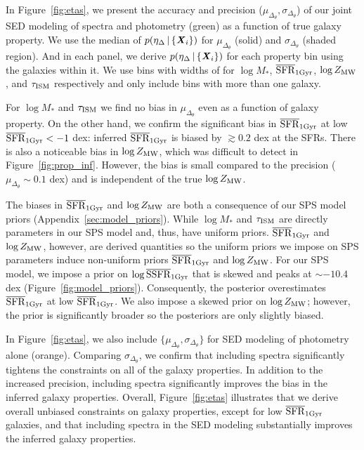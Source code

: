 In Figure~\ref{fig:etas}, we present the accuracy and precision
($\mu_{\Delta_{\theta}}, \sigma_{\Delta_{\theta}}$) of our joint
SED modeling of spectra and photometry (green) as a function of true galaxy
property. 
We use the median of $p(\eta_\Delta \,|\, \{{\textbf{\textit{X}}_i}\})$ for
$\mu_{\Delta_{\theta}}$ (solid) and $\sigma_{\Delta_{\theta}}$ (shaded region).
And in each panel, we derive $p(\eta_\Delta \,|\, \{{\textbf{\textit{X}}_i}\})$ for each
property bin using the galaxies within it.
We use bins with widths of  for $\log
M_*$, $\overline{\rm SFR}_{\rm 1Gyr}$, $\log Z_{\rm MW}$, and $\tau_{\rm ISM}$ respectively and only
include bins with more than one galaxy. 

For $\log M_*$ and $\tau_{\rm ISM}$ we find no bias in $\mu_{\Delta_{\theta}}$
even as a function of galaxy property. 
On the other hand, we confirm the significant bias in $\overline{\rm SFR}_{\rm 1Gyr}$ at low $\overline{\rm SFR}_{\rm 1Gyr}
< -1$ dex: inferred $\overline{\rm SFR}_{\rm 1Gyr}$ is biased by $\gtrsim 0.2$ dex at the SFRs. 
There is also a noticeable bias in $\log Z_{\rm MW}$, which was difficult to
detect in Figure~\ref{fig:prop_inf}. 
However, the bias is small compared to the precision ($\mu_{\Delta_{\theta}}
\sim 0.1$ dex) and is independent of the true $\log Z_{\rm MW}$. 

The biases in $\overline{\rm SFR}_{\rm 1Gyr}$ and $\log Z_{\rm MW}$ are both a consequence of our SPS
model priors (Appendix~\ref{sec:model_priors}). 
While $\log M_*$ and $\tau_{\rm ISM}$ are directly parameters in our SPS model
and, thus, have uniform priors.
$\overline{\rm SFR}_{\rm 1Gyr}$ and $\log Z_{\rm MW}$, however, are derived quantities so the uniform
priors we impose on SPS parameters induce non-uniform priors $\overline{\rm SFR}_{\rm 1Gyr}$ and
$\log Z_{\rm MW}$.
For our SPS model, we impose a prior on $\log \overline{\rm SSFR}_{\rm 1 Gyr}$
that is skewed and peaks at ${\sim}-10.4$ dex (Figure~\ref{fig:model_priors}). 
Consequently, the posterior overestimates $\overline{\rm SFR}_{\rm 1Gyr}$ at low $\overline{\rm SFR}_{\rm 1Gyr}$.
We also impose a skewed prior on $\log Z_{\rm MW}$; however, the prior is
significantly broader so the posteriors are only slightly biased. 

In Figure~\ref{fig:etas}, we also include $\{\mu_{\Delta_{\theta}},
\sigma_{\Delta_{\theta}}\}$ for SED modeling of photometry alone (orange). 
Comparing $\sigma_{\Delta_{\theta}}$, we confirm that including spectra
significantly tightens the constraints on all of the galaxy properties. 
In addition to the increased precision, including spectra significantly
improves the bias in the inferred galaxy properties. 
Overall, Figure~\ref{fig:etas} illustrates that we derive overall unbiased
constraints on galaxy properties, except for low $\overline{\rm SFR}_{\rm 1Gyr}$ galaxies, and that
including spectra in the SED modeling substantially improves the inferred
galaxy properties. 

